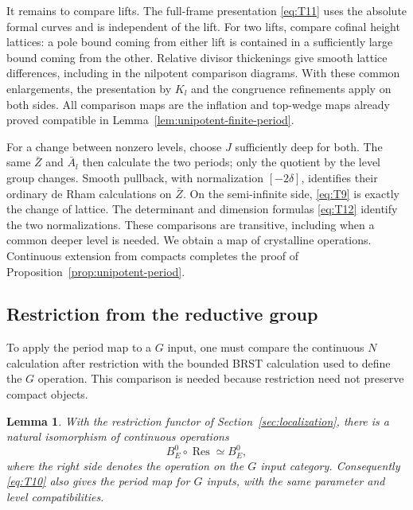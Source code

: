 \documentclass[11pt]{article}
\numberwithin{equation}{section}
\newtheorem{lemma}[theorem]{Lemma}
\theoremstyle{definition}
\theoremstyle{remark}
\begin{document}
It remains to compare lifts.  The full-frame presentation
\eqref{eq:T11} uses the absolute formal curves and is independent of
the lift.  For two lifts, compare cofinal height lattices: a pole
bound coming from either lift is contained in a sufficiently large
bound coming from the other.  Relative divisor thickenings give
smooth lattice differences, including in the nilpotent comparison
diagrams.  With these common enlargements, the presentation by
$K_l$ and the congruence refinements apply on both sides.  All
comparison maps are the inflation and top-wedge maps already proved
compatible in Lemma~\ref{lem:unipotent-finite-period}.

For a change between nonzero levels, choose $J$ sufficiently deep
for both.  The same $\bar Z$ and $\bar A_l$ then calculate the two
periods; only the quotient by the level group changes.  Smooth
pullback, with normalization $[-2\delta]$, identifies their ordinary
de Rham calculations on $\bar Z$.  On the semi-infinite side,
\eqref{eq:T9} is exactly the change of lattice.  The determinant and
dimension formulas \eqref{eq:T12} identify the two normalizations.
These comparisons are transitive, including when a common deeper
level is needed.  We obtain a map of crystalline operations.
Continuous extension from compacts completes the proof of
Proposition~\ref{prop:unipotent-period}.

\subsection{Restriction from the reductive group}

To apply the period map to a $G$ input, one must compare the
continuous $N$ calculation after restriction with the bounded BRST
calculation used to define the $G$ operation.  This comparison is
needed because restriction need not preserve compact objects.

\begin{lemma}\label{lem:unipotent-restriction}
With the restriction functor of Section~\ref{sec:localization}, there
is a natural isomorphism of continuous operations
\begin{equation}\label{eq:T15}
 B_E^0\circ\operatorname{Res}\simeq B_E^0,
\end{equation}
where the right side denotes the operation on the $G$ input category.
Consequently \eqref{eq:T10} also gives the period map for $G$ inputs,
with the same parameter and level compatibilities.
\end{lemma}
\end{document}
